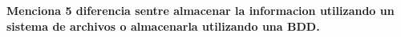 \begin{center}
    \textbf{Menciona 5 diferencia sentre almacenar la informacion utilizando un sistema de archivos o almacenarla utilizando una BDD.}
\end{center}
